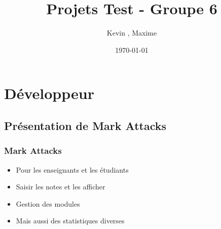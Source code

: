 \documentclass{beamer}
\title{Projets Test - Groupe 6}
\author{Kevin \bsc{Boulala}, Maxime \bsc{Dubois}}
\institute{Université de Franche Comté}
\date{\today}
\begin{document}
  \begin{frame}
    \titlepage
  \end{frame}

  \begin{frame}
    \setcounter{tocdepth}{2}
	  \tableofcontents[]
  \end{frame}
  
  \section{Développeur}
  
    \begin{frame}
    	\tableofcontents[currentsection]
    \end{frame}
  
    \subsection{Présentation de Mark Attacks}
      \begin{frame}
        \frametitle{Mark Attacks}
        \begin{block}{}
          \begin{itemize}
            \item Pour les enseignants et les étudiants
            \item Saisir les notes et les afficher
            \item Gestion des modules
            \item Mais aussi des statistiques diverses
          \end{itemize}
        \end{block}
      \end{frame}
    
\end{document}
